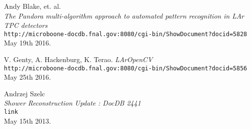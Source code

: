 


\newpage



\newpage



\newpage



\newpage



\newpage


\begin{thebibliography}{9}

Andy Blake, et. al.\\
\emph{The Pandora multi-algorithm approach to automated pattern recognition in LAr TPC detectors}\\
\texttt{http://microboone-docdb.fnal.gov:8080/cgi-bin/ShowDocument?docid=5828}\\
May 19th 2016.

V. Genty, A. Hackenburg, K. Terao.
\emph{LArOpenCV}\\
\texttt{http://microboone-docdb.fnal.gov:8080/cgi-bin/ShowDocument?docid=5856}\\
May 25th 2016.

Andrzej Szelc\\
\emph{Shower Reconstruction Update : DocDB 2441}\\
\texttt{link}\\
May 15th 2013.

\end{thebibliography}


